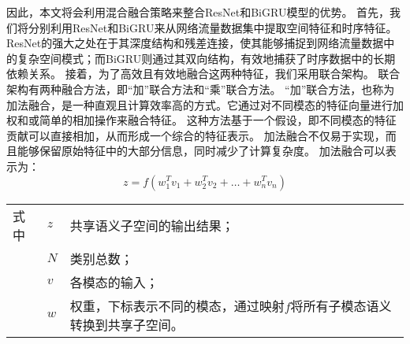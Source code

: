 因此，本文将会利用混合融合策略来整合ResNet和BiGRU模型的优势。
首先，我们将分别利用ResNet和BiGRU来从网络流量数据集中提取空间特征和时序特征。
ResNet的强大之处在于其深度结构和残差连接，使其能够捕捉到网络流量数据中的复杂空间模式；而BiGRU则通过其双向结构，有效地捕获了时序数据中的长期依赖关系。
接着，为了高效且有效地融合这两种特征，我们采用联合架构。
联合架构有两种融合方法，即“加”联合方法和“乘”联合方法。
“加”联合方法，也称为加法融合，是一种直观且计算效率高的方式。它通过对不同模态的特征向量进行加权和或简单的相加操作来融合特征。
这种方法基于一个假设，即不同模态的特征贡献可以直接相加，从而形成一个综合的特征表示。
加法融合不仅易于实现，而且能够保留原始特征中的大部分信息，同时减少了计算复杂度。
加法融合可以表示为：
\begin{equation}
	z = f(w_1^Tv_1 + w_2^Tv_2+ \dots + w_n^Tv_n)
\end{equation}
\begin{flushleft}
	\renewcommand\arraystretch{1.25}
	\begin{tabularx}{\textwidth}{@{}>{\normalsize\rm}l@{\quad}>{\normalsize\rm}l@{——}>{\normalsize\rm}X@{}}
		式中 & $z$ & 共享语义子空间的输出结果；                         \\
		   & $N$ & 类别总数；                                 \\
		   & $v$ & 各模态的输入；                               \\
		   & $w$ & 权重，下标表示不同的模态，通过映射$f$将所有子模态语义转换到共享子空间。 \\
	\end{tabularx}\vspace{.5ex}%
\end{flushleft}


